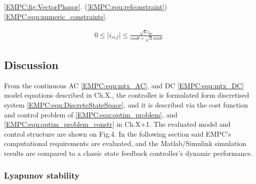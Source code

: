      \ref{EMPC:fig:VectorPhasor}.  (\ref{EMPC:equ:refconstraint})  \ref{EMPC:equ:numeric_constraints}.

    \begin{equation}
        \begin{array}{l}
            0\leq|i_{ref}|\leq\frac{\sqrt{6}i_{dc}}{cos\theta+\sqrt{3}sin\theta}
        \end{array}
        \label{EMPC:equ:refconstraint}
    \end{equation}



\subsection{Discussion}\label{EMPC:sec:Discussion}

    From the continuous AC \ref{EMPC:equ:mtx_AC}, and DC \ref{EMPC:equ:mtx_DC} model equations described in Ch.X., the controller is formulated form discretised system \ref{EMPC:equ:DiscreteStateSpace}, and it is described via the cost function and control problem of \ref{EMPC:equ:optim_problem}, and \ref{EMPC:equ:optim_problem_constr} in Ch.X$+$1. The evaluated model and control structure are shown on Fig.4. In the following section said EMPC’s computational requirements are evaluated, and the Matlab/Simulink simulation results are compared to a classic state feedback controller’s dynamic performance.

    \subsubsection{Lyapunov stability}\label{EMPC:sec:LyapStab}

